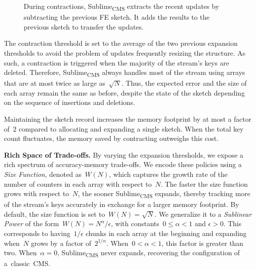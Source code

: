 \documentclass[sigconf]{acmart}
\newcommand{\sketch}{Sublime}
\newcommand{\sketchcms}{\sketch\textsubscript{CMS}\xspace}
\begin{document}
\begin{figure}
    \caption{During contractions, \sketchcms extracts the recent updates by
    subtracting the previous FE sketch. It adds the results to the previous
    sketch to transfer the updates.}
    \label{fig:contraction}
\end{figure}
\fi

The contraction threshold is set to the average of the two previous expansion
thresholds to avoid the problem of updates frequently resizing the structure.
As such, a contraction is triggered when the majority of the stream's keys are
deleted. Therefore, \sketchcms always handles most of the stream using arrays
that are at most twice as large as~$\sqrt{N}$. Thus, the expected error and the
size of each array remain the same as before, despite the state of the sketch
depending on the sequence of insertions and deletions.

Maintaining the sketch record increases the memory footprint by at most a
factor of~$2$ compared to allocating and expanding a single sketch. When the
total key count fluctuates, the memory saved by contracting outweighs this
cost.

\textbf{Rich Space of Trade-offs.}
By varying the expansion thresholds, we expose a rich spectrum of accuracy-memory trade-offs.
We encode these policies using a \emph{Size Function}, denoted as~$W(N)$, which captures the growth rate of the number of counters in each array with respect to~$N$.
The faster the size function grows with respect to~$N$, the sooner \sketchcms expands, thereby tracking more of the stream's keys accurately in exchange for a larger memory footprint.
By default, the size function is set to~$W(N)=\sqrt{N}$.
We generalize it to a \emph{Sublinear Power} of the form~$W(N)=N^\alpha/\epsilon$, with constants~$0 \leq \alpha < 1$ and $\epsilon > 0$.
This corresponds to having~$1/\epsilon$ chunks in each array at the beginning and expanding when~$N$ grows by a factor of~$2^{1/\alpha}$.
When~$0<\alpha<1$, this factor is greater than two.
When~$\alpha=0$, \sketchcms never expands, recovering the configuration of \mbox{a classic CMS}.
\end{document}
